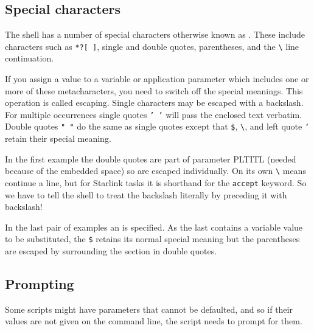 \documentclass[twoside,11pt,nolof]{starlink}
\begin{document}
\subsection{Special characters
\label{sc4_se_spec_char}}

The shell has a number of special characters otherwise known as
.  These include
 characters such as \texttt{*?[~]},
single and double quotes, parentheses, and the \verb+\+ line
continuation.

If you assign a value to a variable or application parameter which
includes one or more of these metacharacters, you need to switch off
the special meanings.  This operation is called escaping.
Single characters may be escaped with a backslash.  For multiple
occurrences single quotes \texttt{'~'} will pass the enclosed text
verbatim.  Double quotes \texttt{"~"} do the same as single quotes except
that \texttt{\$}, \verb+\+, and left quote \texttt{`} retain their special
meaning.

\begin{small}
\end{small}
In the first example the double quotes are part of parameter PLTITL
(needed because of the embedded space) so are escaped individually.  On
its own \verb+\+ means continue a line, but for Starlink tasks it is
shorthand for the \texttt{accept} keyword.  So we have to tell the shell to
treat the backslash literally by preceding it with backslash!

In the last pair of examples an 
is specified.  As the last contains a variable value to be
substituted, the \texttt{\$} retains its normal special meaning but the
parentheses are escaped by surrounding the section in double quotes.

\newpage
\subsection{Prompting\label{sc4_se_prompting}}

Some scripts might have parameters that cannot be defaulted, and so
if their values are not given on the command line, the script
needs to prompt for them.
\end{document}
